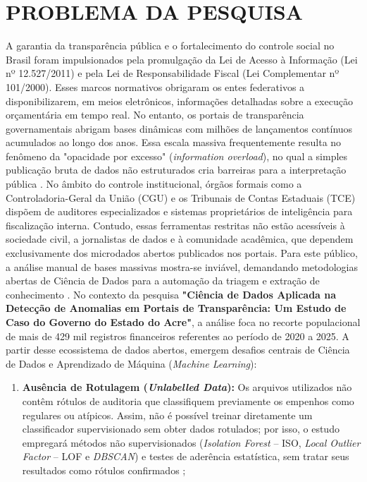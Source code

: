 \documentclass[
    12pt,               %
    openright,          %
    oneside,            %
    a4paper,            %
    chapter=TITLE,      %
    sumario=tradicional,%
    english,            %
    brazilian,          %
 ]{abntex2}
\begin{document}
\chapter{PROBLEMA DA PESQUISA}\label{sec:problema}
A garantia da transparência pública e o fortalecimento do controle social no Brasil foram impulsionados pela promulgação da Lei de Acesso à Informação (Lei nº 12.527/2011) e pela Lei de Responsabilidade Fiscal (Lei Complementar nº 101/2000). Esses marcos normativos obrigaram os entes federativos a disponibilizarem, em meios eletrônicos, informações detalhadas sobre a execução orçamentária em tempo real. No entanto, os portais de transparência governamentais abrigam bases dinâmicas com milhões de lançamentos contínuos acumulados ao longo dos anos. Essa escala massiva frequentemente resulta no fenômeno da "opacidade por excesso" (\textit{information overload}), no qual a simples publicação bruta de dados não estruturados cria barreiras para a interpretação pública \cite{cavalcanti2014, pereira2025}. No âmbito do controle institucional, órgãos formais como a Controladoria-Geral da União (CGU) e os Tribunais de Contas Estaduais (TCE) dispõem de auditores especializados e sistemas proprietários de inteligência para fiscalização interna. Contudo, essas ferramentas restritas não estão acessíveis à sociedade civil, a jornalistas de dados e à comunidade acadêmica, que dependem exclusivamente dos microdados abertos publicados nos portais. Para este público, a análise manual de bases massivas mostra-se inviável, demandando metodologias abertas de Ciência de Dados para a automação da triagem e extração de conhecimento \cite{nunes2021}. No contexto da pesquisa \textbf{"Ciência de Dados Aplicada na Detecção de Anomalias em Portais de Transparência: Um Estudo de Caso do Governo do Estado do Acre"}, a análise foca no recorte populacional de mais de 429 mil registros financeiros referentes ao período de 2020 a 2025. A partir desse ecossistema de dados abertos, emergem desafios centrais de Ciência de Dados e Aprendizado de Máquina (\textit{Machine Learning}):\begin{enumerate}
    \item \textbf{Ausência de Rotulagem (\textit{Unlabelled Data}):} Os arquivos utilizados não contêm rótulos de auditoria que classifiquem previamente os empenhos como regulares ou atípicos. Assim, não é possível treinar diretamente um classificador supervisionado sem obter dados rotulados; por isso, o estudo empregará métodos não supervisionados (\textit{Isolation Forest} -- ISO, \textit{Local Outlier Factor} -- LOF e \textit{DBSCAN}) e testes de aderência estatística, sem tratar seus resultados como rótulos confirmados \cite{nunes2021, goldschmidt2005};

\end{enumerate}
\end{document}
